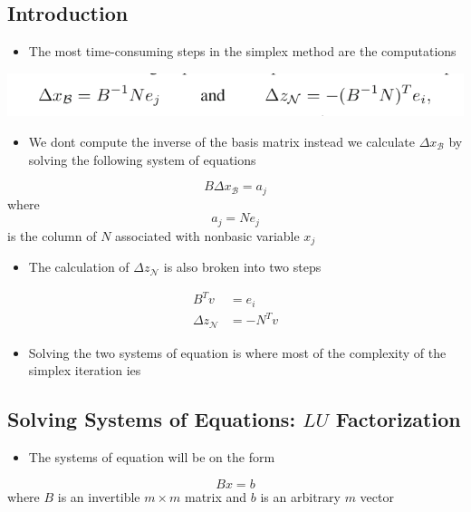 \documentclass[11pt]{article}
\begin{document}
\subsection{Introduction}
\label{sec:orgf5d605d}
\begin{itemize}
\item The most time-consuming steps in the simplex method are the computations
\end{itemize}
\begin{center}
\includegraphics[width=.9\linewidth]{Implementation Issues/screenshot_2019-02-11_18-03-47.png}
\end{center}
\begin{itemize}
\item We dont compute the inverse of the basis matrix instead we calculate \(\Delta x_{\mathcal B}\) by solving the following system of equations
\end{itemize}
\begin{equation}
  B \Delta x_{\mathcal B} = a_j 
\end{equation}
where
\begin{equation}
  a_j = N e_j
\end{equation}
is the column of \(N\) associated with nonbasic variable \(x_j\) 
\begin{itemize}
\item The calculation of \(\Delta z_{\mathcal N}\) is also broken into two steps
\end{itemize}
\begin{align*}
	B^T v &= e_i  \\
	\Delta z_{\mathcal N} &= -N^T v
\end{align*}
\begin{itemize}
\item Solving the two systems of equation is where most of the complexity of the simplex iteration ies
\end{itemize}

\subsection{Solving Systems of Equations: \(LU\) Factorization}
\label{sec:orgddc9090}
\begin{itemize}
\item The systems of equation will be on the form
\end{itemize}
\begin{equation*}
  B x = b
\end{equation*}
where \(B\) is an invertible \(m \times m\) matrix and \(b\) is an arbitrary \(m\) vector
\end{document}
